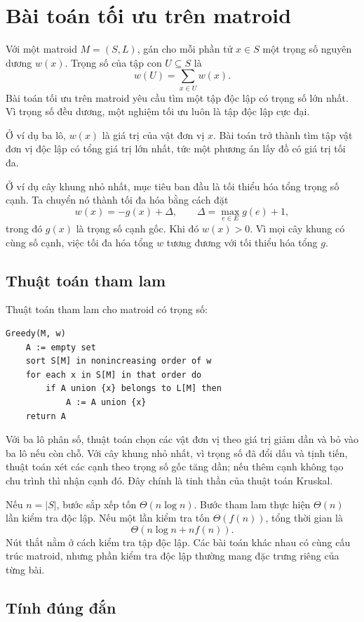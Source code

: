\documentclass[11pt]{article}
\begin{document}
\section{Bài toán tối ưu trên matroid}

Với một matroid \(M=(S,L)\), gán cho mỗi phần tử \(x\in S\) một trọng số nguyên
dương \(w(x)\). Trọng số của tập con \(U\subseteq S\) là
\[
  w(U)=\sum_{x\in U}w(x).
\]
Bài toán tối ưu trên matroid yêu cầu tìm một tập độc lập có trọng số lớn nhất.
Vì trọng số đều dương, một nghiệm tối ưu luôn là tập độc lập cực đại.

Ở ví dụ ba lô, \(w(x)\) là giá trị của vật đơn vị \(x\). Bài toán trở thành tìm
tập vật đơn vị độc lập có tổng giá trị lớn nhất, tức một phương án lấy đồ có
giá trị tối đa.

Ở ví dụ cây khung nhỏ nhất, mục tiêu ban đầu là tối thiểu hóa tổng trọng số
cạnh. Ta chuyển nó thành tối đa hóa bằng cách đặt
\[
  w(x)=-g(x)+\Delta,\qquad \Delta=\max_{e\in E}g(e)+1,
\]
trong đó \(g(x)\) là trọng số cạnh gốc. Khi đó \(w(x)>0\). Vì mọi cây khung có
cùng số cạnh, việc tối đa hóa tổng \(w\) tương đương với tối thiểu hóa tổng
\(g\).

\subsection*{Thuật toán tham lam}

Thuật toán tham lam cho matroid có trọng số:
\begin{verbatim}
Greedy(M, w)
    A := empty set
    sort S[M] in nonincreasing order of w
    for each x in S[M] in that order do
        if A union {x} belongs to L[M] then
            A := A union {x}
    return A
\end{verbatim}

Với ba lô phân số, thuật toán chọn các vật đơn vị theo giá trị giảm dần và bỏ
vào ba lô nếu còn chỗ. Với cây khung nhỏ nhất, vì trọng số đã đổi dấu và tịnh
tiến, thuật toán xét các cạnh theo trọng số gốc tăng dần; nếu thêm cạnh không
tạo chu trình thì nhận cạnh đó. Đây chính là tinh thần của thuật toán Kruskal.

Nếu \(n=|S|\), bước sắp xếp tốn \(\Theta(n\log n)\). Bước tham lam thực hiện
\(\Theta(n)\) lần kiểm tra độc lập. Nếu một lần kiểm tra tốn
\(\Theta(f(n))\), tổng thời gian là
\[
  \Theta(n\log n+n f(n)).
\]
Nút thắt nằm ở cách kiểm tra tập độc lập. Các bài toán khác nhau có cùng cấu
trúc matroid, nhưng phần kiểm tra độc lập thường mang đặc trưng riêng của từng
bài.

\subsection*{Tính đúng đắn}
\end{document}
